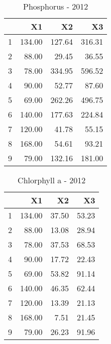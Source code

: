 \documentclass{article}\usepackage{graphicx, color}
\begin{document}
\begin{table}[ht]
\centering
\begin{tabular}{rrrr}
  \hline
 & X1 & X2 & X3 \\ 
  \hline
1 & 134.00 & 127.64 & 316.31 \\ 
  2 & 88.00 & 29.45 & 36.55 \\ 
  3 & 78.00 & 334.95 & 596.52 \\ 
  4 & 90.00 & 52.77 & 87.60 \\ 
  5 & 69.00 & 262.26 & 496.75 \\ 
  6 & 140.00 & 177.63 & 224.84 \\ 
  7 & 120.00 & 41.78 & 55.15 \\ 
  8 & 168.00 & 54.61 & 93.21 \\ 
  9 & 79.00 & 132.16 & 181.00 \\ 
   \hline
\end{tabular}
\caption{Phosphorus - 2012} 
\end{table}

\begin{table}[ht]
\centering
\begin{tabular}{rrrr}
  \hline
 & X1 & X2 & X3 \\ 
  \hline
1 & 134.00 & 37.50 & 53.23 \\ 
  2 & 88.00 & 13.08 & 28.94 \\ 
  3 & 78.00 & 37.53 & 68.53 \\ 
  4 & 90.00 & 17.72 & 22.43 \\ 
  5 & 69.00 & 53.82 & 91.14 \\ 
  6 & 140.00 & 46.35 & 62.44 \\ 
  7 & 120.00 & 13.39 & 21.13 \\ 
  8 & 168.00 & 7.51 & 21.45 \\ 
  9 & 79.00 & 26.23 & 91.96 \\ 
   \hline
\end{tabular}
\caption{Chlorphyll a - 2012} 
\end{table}
\end{document}
